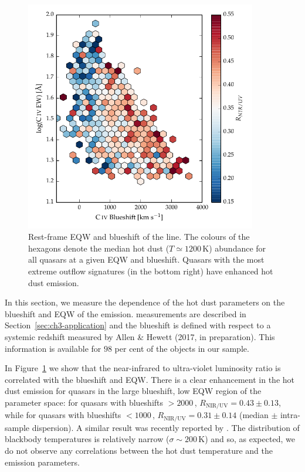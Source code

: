 \begin{figure}[t!]
\centering
  \includegraphics[width=0.9\textwidth]{figures/chapter05/hot_dust_ratio.pdf}
\caption[{Hot dust abundance as a function of rest-frame EQW and blueshift of the  line.}]{Rest-frame EQW and blueshift of the  line. The colours of the hexagons denote the median hot dust ($T\simeq1200$\,K) abundance for all quasars at a given EQW and blueshift. Quasars with the most extreme outflow signatures (in the bottom right) have enhanced hot dust emission.}
  \label{fig:civ_hot_dust}
\end{figure}

In this section, we measure the dependence of the hot dust parameters on the blueshift and EQW of the  emission.
 measurements are described in Section~\ref{sec:ch3-application} and the  blueshift is defined with respect to a systemic redshift measured by Allen \& Hewett (2017, in preparation).
This information is available for $98$ per cent of the objects in our sample.

In Figure~\ref{fig:civ_hot_dust} we show that the near-infrared to ultra-violet luminosity ratio is correlated with the  blueshift and EQW.
There is a clear enhancement in the hot dust emission for quasars in the large  blueshift, low EQW region of the parameter space: for quasars with  blueshifts $>2000$\,\kms, $R_{\text{NIR/UV}}=0.43\pm0.13$, while for quasars with  blueshifts $<1000$\,\kms, $R_{\text{NIR/UV}}=0.31\pm0.14$ (median $\pm$ intra-sample dispersion).
A similar result was recently reported by \citet{wang13}.
The distribution of blackbody temperatures is relatively narrow ($\sigma\sim200$\,K) and so, as expected, we do not observe any correlations between the hot dust temperature and the  emission parameters.

